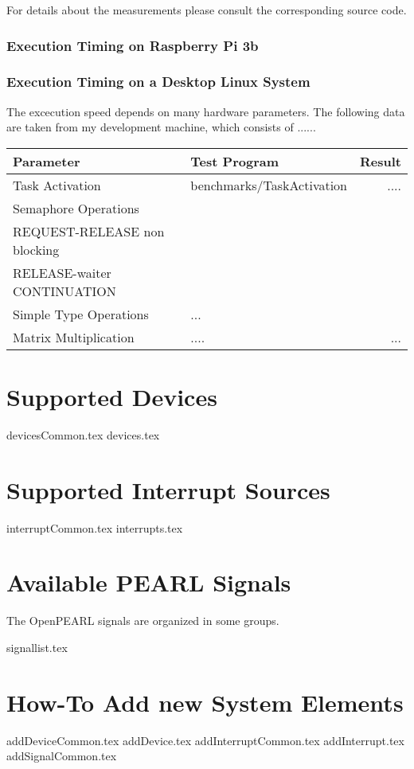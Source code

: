 \documentclass[10pt]{scrbook}
\begin{document}
For details about the measurements please consult the corresponding
source code.

\subsection{Execution Timing on Raspberry Pi 3b}

\subsection{Execution Timing on a Desktop Linux System}
The excecution speed depends on many hardware parameters. 
The following data are taken from my development machine, which consists of
......
\begin{tabular}{|p{5cm}|l|r|}
\hline
Parameter & Test Program & Result \\
\hline
Task Activation & benchmarks/TaskActivation & ....\\
\hline
Semaphore Operations &  & \\
REQUEST-RELEASE non blocking & & \\
RELEASE-waiter CONTINUATION & & \\

\hline
Simple Type Operations & ... & \\
\hline
Matrix Multiplication & .... & ...\\
\hline
\end{tabular}



\chapter{Supported Devices}
{devicesCommon.tex}
{devices.tex}

\chapter{Supported Interrupt Sources}
{interruptCommon.tex}
{interrupts.tex}

\chapter{Available PEARL Signals}
The OpenPEARL signals are organized in some groups.

{signallist.tex}


\chapter{How-To Add new System Elements}
{addDeviceCommon.tex}
{addDevice.tex}
{addInterruptCommon.tex}
{addInterrupt.tex}
{addSignalCommon.tex}
\end{document}
